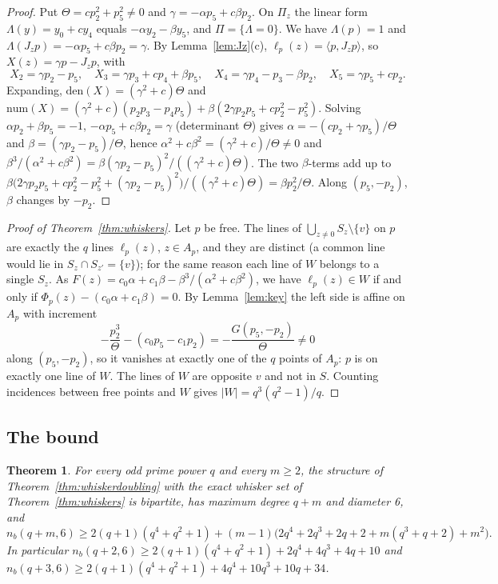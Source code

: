 \documentclass[11pt]{amsart}
\newtheorem{theorem}{Theorem}[section]
\theoremstyle{definition}
\theoremstyle{remark}
\numberwithin{equation}{section}
\newcommand{\nb}{n_b}
\begin{document}
\begin{proof}
Put $\Theta=cp_2^2+p_5^2\ne0$ and $\gamma=-\alpha p_5+c\beta p_2$. On $\Pi_z$ the linear form $\Lambda(y)=y_0+cy_4$ equals
$-\alpha y_2-\beta y_5$, and $\Pi=\{\Lambda=0\}$. We have $\Lambda(p)=1$ and $\Lambda(J_zp)=-\alpha p_5+c\beta p_2=\gamma$. By
Lemma~\ref{lem:Jz}(c), $\ell_p(z)=\langle p,J_zp\rangle$, so $X(z)=\gamma p-J_zp$, with
\[
X_2=\gamma p_2-p_5,\quad X_3=\gamma p_3+cp_4+\beta p_5,\quad X_4=\gamma p_4-p_3-\beta p_2,\quad X_5=\gamma p_5+cp_2 .
\]
Expanding, $\mathrm{den}(X)=(\gamma^2+c)\Theta$ and
$\mathrm{num}(X)=(\gamma^2+c)(p_2p_3-p_4p_5)+\beta(2\gamma p_2p_5+cp_2^2-p_5^2)$. Solving $\alpha p_2+\beta p_5=-1$,
$-\alpha p_5+c\beta p_2=\gamma$ (determinant $\Theta$) gives $\alpha=-(cp_2+\gamma p_5)/\Theta$ and
$\beta=(\gamma p_2-p_5)/\Theta$, hence $\alpha^2+c\beta^2=(\gamma^2+c)/\Theta\ne0$ and
$\beta^3/(\alpha^2+c\beta^2)=\beta(\gamma p_2-p_5)^2/((\gamma^2+c)\Theta)$. The two $\beta$-terms add up to
$\beta\bigl(2\gamma p_2p_5+cp_2^2-p_5^2+(\gamma p_2-p_5)^2\bigr)/((\gamma^2+c)\Theta)=\beta p_2^2/\Theta$. Along $(p_5,-p_2)$,
$\beta$ changes by $-p_2$.
\end{proof}

\begin{proof}[Proof of Theorem~\ref{thm:whiskers}]
Let $p$ be free. The lines of $\bigcup_{z\ne0}S_z\setminus\{v\}$ on $p$ are exactly the $q$ lines $\ell_p(z)$, $z\in
A_p$, and they are distinct (a common line would lie in $S_z\cap S_{z'}=\{v\}$); for the same reason each line of $W$
belongs to a single $S_z$. As $F(z)=c_0\alpha+c_1\beta-\beta^3/(\alpha^2+c\beta^2)$, we have $\ell_p(z)\in W$ if and only if
$\Phi_p(z)-(c_0\alpha+c_1\beta)=0$. By Lemma~\ref{lem:key} the left side is affine on $A_p$ with increment
\[
-\frac{p_2^3}{\Theta}-(c_0p_5-c_1p_2)=-\frac{G(p_5,-p_2)}{\Theta}\ne0
\]
along $(p_5,-p_2)$, so it vanishes at exactly one of the $q$ points of $A_p$: $p$ is on exactly one line of $W$. The lines
of $W$ are opposite $v$ and not in $S$. Counting incidences between free points and $W$ gives $|W|=q^3(q^2-1)/q$.
\end{proof}

\subsection{The bound}\label{ssec:thmD}

\begin{theorem}\label{thm:D}
For every odd prime power $q$ and every $m\ge2$, the structure of Theorem~\ref{thm:whiskerdoubling} with the exact whisker
set of Theorem~\ref{thm:whiskers} is bipartite, has maximum degree $q+m$ and diameter 6, and
\[
\nb(q+m,6)\ge2(q+1)(q^4+q^2+1)+(m-1)\bigl(2q^4+2q^3+2q+2+m(q^3+q+2)+m^2\bigr).
\]
In particular $\nb(q+2,6)\ge2(q+1)(q^4+q^2+1)+2q^4+4q^3+4q+10$ and
$\nb(q+3,6)\ge2(q+1)(q^4+q^2+1)+4q^4+10q^3+10q+34$.
\end{theorem}
\end{document}

